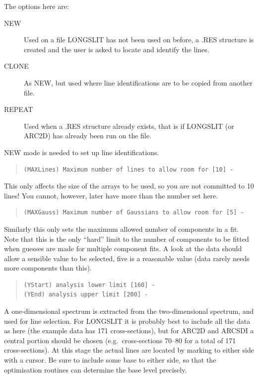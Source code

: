 \documentclass[11pt,twoside]{article}
\begin{document}
The options here are:

\begin{description}

\item[NEW] Used on a file LONGSLIT has not been used on before, a
.RES structure is created and the user is asked to locate and identify
the lines.

\item[CLONE] As NEW, but used where line identifications are to be
copied from another file.

\item[REPEAT] Used when a .RES structure already exists, that is if
LONGSLIT (or ARC2D) has already been run on the file.

\end{description}

NEW mode is needed to set up line identifications.

\begin{quote}\begin{verbatim}
(MAXLines) Maximum number of lines to allow room for [10] -
\end{verbatim}\end{quote}

This only affects the size of the arrays to be used, so you are not
committed to 10 lines!
You cannot, however, later have more than the number set here.

\begin{quote}\begin{verbatim}
(MAXGauss) Maximum number of Gaussians to allow room for [5] -
\end{verbatim}\end{quote}

Similarly this only sets the maximum allowed number of components in a
fit.
Note that this is the only ``hard'' limit to the number of components to
be fitted when guesses are made for multiple component fits.
A look at the data should allow a sensible value to be selected, five is
a reasonable value (data rarely needs more components than this).

\begin{quote}\begin{verbatim}
(YStart) analysis lower limit [160] -
(YEnd) analysis upper limit [200] -
\end{verbatim}\end{quote}

A one-dimensional spectrum is extracted from the two-dimensional
spectrum, and used for line selection.
For LONGSLIT it is probably best to include all the data as here (the
example data has 171 cross-sections), but for ARC2D and ARCSDI a central
portion should be chosen (e.g.\ cross-sections 70--80 for a total of 171
cross-sections).
At this stage the actual lines are located by marking to either side
with a cursor.
Be sure to include some base to either side, so that the optimisation
routines can determine the base level precisely.
\end{document}
